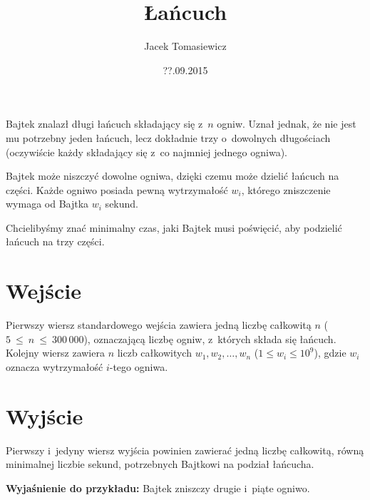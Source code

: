 \documentclass[zad,zawodnik,utf8]{sinol}
\title{Łańcuch}
\date{??.09.2015}
\author{Jacek Tomasiewicz}
\begin{document}
  \begin{tasktext}%
    Bajtek znalazł długi łańcuch składający się z~$n$ ogniw.
    Uznał jednak, że nie jest mu potrzebny jeden łańcuch,
    lecz dokładnie trzy o~dowolnych długościach (oczywiście każdy składający się z~co najmniej jednego ogniwa).

Bajtek może niszczyć dowolne ogniwa, dzięki czemu może dzielić łańcuch na części.
    Każde ogniwo posiada pewną wytrzymałość $w_i$, którego zniszczenie wymaga od Bajtka $w_i$ sekund.

    Chcielibyśmy znać minimalny czas, jaki Bajtek musi poświęcić, aby podzielić łańcuch na trzy części.

    \section{Wejście}
      Pierwszy wiersz standardowego wejścia zawiera jedną liczbę całkowitą $n$ ($5~\leq~n~\leq~300\,000$),
      oznaczającą liczbę ogniw, z~których składa się łańcuch.
      Kolejny wiersz zawiera $n$ liczb całkowitych $w_1, w_2, \ldots, w_n$ ($1 \leq w_i \leq 10^9$),
      gdzie $w_i$ oznacza wytrzymałość $i$-tego ogniwa.

    \section{Wyjście}
      Pierwszy i~jedyny wiersz wyjścia powinien zawierać jedną liczbę całkowitą,
      równą minimalnej liczbie sekund, potrzebnych Bajtkowi na podział łańcucha.

    \makecompactexample

  \medskip
  \noindent
  \textbf{Wyjaśnienie do przykładu:} 
  Bajtek zniszczy drugie i~piąte ogniwo.

  \end{tasktext}
\end{document}
